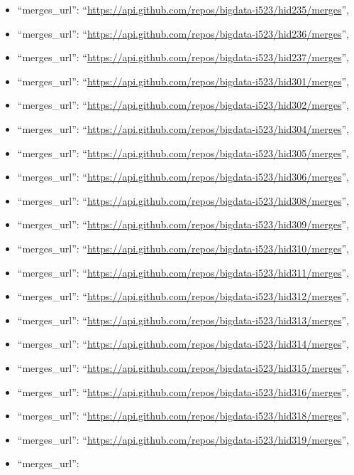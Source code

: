 \begin{itemize}
\item
  ``merges\_url'':
  ``\url{https://api.github.com/repos/bigdata-i523/hid235/merges}'',
\item
  ``merges\_url'':
  ``\url{https://api.github.com/repos/bigdata-i523/hid236/merges}'',
\item
  ``merges\_url'':
  ``\url{https://api.github.com/repos/bigdata-i523/hid237/merges}'',
\item
  ``merges\_url'':
  ``\url{https://api.github.com/repos/bigdata-i523/hid301/merges}'',
\item
  ``merges\_url'':
  ``\url{https://api.github.com/repos/bigdata-i523/hid302/merges}'',
\item
  ``merges\_url'':
  ``\url{https://api.github.com/repos/bigdata-i523/hid304/merges}'',
\item
  ``merges\_url'':
  ``\url{https://api.github.com/repos/bigdata-i523/hid305/merges}'',
\item
  ``merges\_url'':
  ``\url{https://api.github.com/repos/bigdata-i523/hid306/merges}'',
\item
  ``merges\_url'':
  ``\url{https://api.github.com/repos/bigdata-i523/hid308/merges}'',
\item
  ``merges\_url'':
  ``\url{https://api.github.com/repos/bigdata-i523/hid309/merges}'',
\item
  ``merges\_url'':
  ``\url{https://api.github.com/repos/bigdata-i523/hid310/merges}'',
\item
  ``merges\_url'':
  ``\url{https://api.github.com/repos/bigdata-i523/hid311/merges}'',
\item
  ``merges\_url'':
  ``\url{https://api.github.com/repos/bigdata-i523/hid312/merges}'',
\item
  ``merges\_url'':
  ``\url{https://api.github.com/repos/bigdata-i523/hid313/merges}'',
\item
  ``merges\_url'':
  ``\url{https://api.github.com/repos/bigdata-i523/hid314/merges}'',
\item
  ``merges\_url'':
  ``\url{https://api.github.com/repos/bigdata-i523/hid315/merges}'',
\item
  ``merges\_url'':
  ``\url{https://api.github.com/repos/bigdata-i523/hid316/merges}'',
\item
  ``merges\_url'':
  ``\url{https://api.github.com/repos/bigdata-i523/hid318/merges}'',
\item
  ``merges\_url'':
  ``\url{https://api.github.com/repos/bigdata-i523/hid319/merges}'',
\item
  ``merges\_url'':

\end{itemize}
